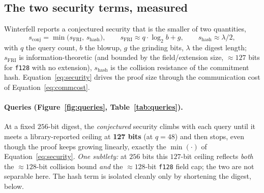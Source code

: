 \documentclass[11pt]{article}
\begin{document}
\subsection{The two security terms, measured}
\label{sec:twoterms}

Winterfell reports a conjectured security that is the smaller of two quantities,
\begin{equation}
  s_{\mathrm{conj}} = \min\!\bigl(s_{\mathrm{FRI}},\, s_{\mathrm{hash}}\bigr),
  \qquad s_{\mathrm{FRI}} \approx q\cdot\log_2 b + g,
  \qquad s_{\mathrm{hash}} \approx \lambda/2,
  \label{eq:security}
\end{equation}
with $q$ the query count, $b$ the blowup, $g$ the grinding bits, $\lambda$ the digest length;
$s_{\mathrm{FRI}}$ is information-theoretic (and bounded by the field/extension size, $\approx\!127$
bits for \texttt{f128} with no extension), $s_{\mathrm{hash}}$ is the collision resistance of the
commitment hash. Equation~\eqref{eq:security} drives the proof size through the communication cost of
Equation~\eqref{eq:commcost}.

\paragraph{Queries (Figure~\ref{fig:queries}, Table~\ref{tab:queries}).} At a fixed $256$-bit digest, the
\emph{conjectured} security climbs with each query until it meets a library-reported ceiling at
\textbf{127 bits} (at $q=48$) and then stops, even though the proof keeps growing linearly, exactly the
$\min(\cdot)$ of Equation~\eqref{eq:security}. \emph{One subtlety:} at $256$ bits this $127$-bit ceiling
reflects \emph{both}
the $\approx\!128$-bit collision bound \emph{and} the $\approx\!128$-bit \texttt{f128} field cap; the
two are not separable here. The hash term is isolated cleanly only by shortening the digest, below.
\end{document}

